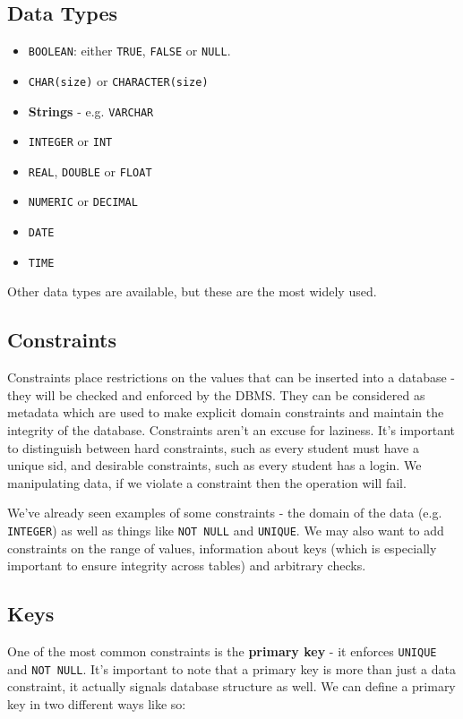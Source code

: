 \documentclass{article}
\begin{document}
	\subsection{Data Types}
	\begin{itemize}
		\item \texttt{BOOLEAN}: either \texttt{TRUE}, \texttt{FALSE} or \texttt{NULL}.
		\item \texttt{CHAR(size)} or \texttt{CHARACTER(size)}
		\item \textbf{Strings} - e.g. \texttt{VARCHAR}
		\item \texttt{INTEGER} or \texttt{INT}
		\item \texttt{REAL}, \texttt{DOUBLE} or \texttt{FLOAT}
		\item \texttt{NUMERIC} or \texttt{DECIMAL}
		\item \texttt{DATE}
		\item \texttt{TIME}
	\end{itemize}
	
	Other data types are available, but these are the most widely used.
	
	\subsection{Constraints}
	Constraints place restrictions on the values that can be inserted into a database - they will be checked and enforced by the DBMS. They can be considered as metadata which are used to make explicit domain constraints and maintain the integrity of the database. Constraints aren't an excuse for laziness. It's important to distinguish between hard constraints, such as every student must have a unique sid, and desirable constraints, such as every student has a login. We manipulating data, if we violate a constraint then the operation will fail.
	
	\par We've already seen examples of some constraints - the domain of the data (e.g. \texttt{INTEGER}) as well as things like \texttt{NOT NULL} and \texttt{UNIQUE}. We may also want to add constraints on the range of values, information about keys (which is especially important to ensure integrity across tables) and arbitrary checks.
	
	\subsection{Keys}
	One of the most common constraints is the \textbf{primary key} - it enforces \texttt{UNIQUE} and \texttt{NOT NULL}. It's important to note that a primary key is more than just a data constraint, it actually signals database structure as well. We can define a primary key in two different ways like so:
	
\end{document}
